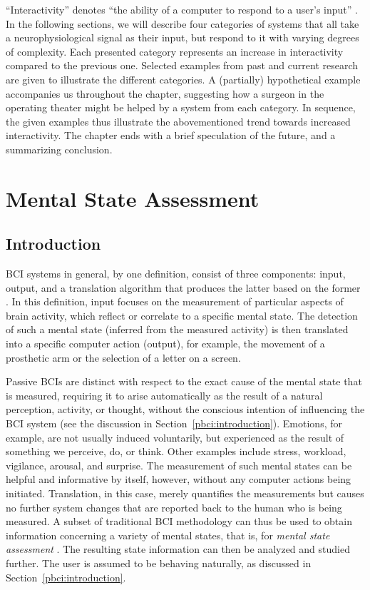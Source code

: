``Interactivity'' denotes ``the ability of a computer to respond to a user's input'' \cite{defoxfordinteractivity}. In the following sections, we will describe four categories of systems that all take a neurophysiological signal as their input, but respond to it with varying degrees of complexity. Each presented category represents an increase in interactivity compared to the previous one. Selected examples from past and current research are given to illustrate the different categories. A (partially) hypothetical example accompanies us throughout the chapter, suggesting how a surgeon in the operating theater might be helped by a system from each category. In sequence, the given examples thus illustrate the abovementioned trend towards increased interactivity. The chapter ends with a brief speculation of the future, and a summarizing conclusion.


\section{Mental State Assessment}

\subsection{Introduction}
BCI systems in general, by one definition, consist of three components: input, output, and a translation algorithm that produces the latter based on the former \cite{wolpaw2000firstmeeting}. In this definition, input focuses on the measurement of particular aspects of brain activity, which reflect or correlate to a specific mental state. The detection of such a mental state (inferred from the measured activity) is then translated into a specific computer action (output), for example, the movement of a prosthetic arm or the selection of a letter on a screen. 

Passive BCIs are distinct with respect to the exact cause of the mental state that is measured, requiring it to arise automatically as the result of a natural perception, activity, or thought, without the conscious intention of influencing the BCI system (see the discussion in Section~\ref{pbci:introduction}). Emotions, for example, are not usually induced voluntarily, but experienced as the result of something we perceive, do, or think. Other examples include stress, workload, vigilance, arousal, and surprise.
The measurement of such mental states can be helpful and informative by itself, however, without any computer actions being initiated. Translation, in this case, merely quantifies the measurements but causes no further system changes that are reported back to the human who is being measured. A subset of traditional BCI methodology can thus be used to obtain information concerning a variety of mental states, that is, for \emph{mental state assessment} \cite{muller2008,vanerp2012beyondmedical,zander2011}. The resulting state information can then be analyzed and studied further. The user is assumed to be behaving naturally, as discussed in Section~\ref{pbci:introduction}.

